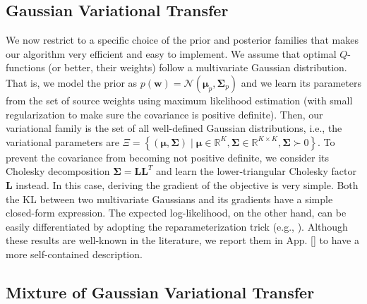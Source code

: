 \documentclass{article}
\begin{document}
\subsection{Gaussian Variational Transfer}\label{sec:gvt}

We now restrict to a specific choice of the prior and posterior families that makes our algorithm very efficient and easy to implement. We assume that optimal $Q$-functions (or better, their weights) follow a multivariate Gaussian distribution. That is, we model the prior as $p(\bm{w}) = \mathcal{N}(\bm{\mu}_p,\bm{\Sigma}_p)$ and we learn its parameters from the set of source weights using maximum likelihood estimation (with small regularization to make sure the covariance is positive definite). Then, our variational family is the set of all well-defined Gaussian distributions, i.e., the variational parameters are $\Xi = \left\{ (\bm{\mu},\bm{\Sigma}) \mid \bm{\mu}\in\mathbb{R}^K, \bm{\Sigma}\in\mathbb{R}^{K\times K}, \bm{\Sigma}\succ 0 \right\}$. To prevent the covariance from becoming not positive definite, we consider its Cholesky decomposition $\bm{\Sigma} = \bm{LL}^T$ and learn the lower-triangular Cholesky factor $\bm{L}$ instead. In this case, deriving the gradient of the objective is very simple. Both the KL between two multivariate Gaussians and its gradients have a simple closed-form expression. The expected log-likelihood, on the other hand, can be easily differentiated by adopting the reparameterization trick (e.g., \cite{hoffman2013stochastic,rezende2014stochastic}). Although these results are well-known in the literature, we report them in App. \ref{} to have a more self-contained description.

\subsection{Mixture of Gaussian Variational Transfer}\label{sec:mgvt}
\end{document}

